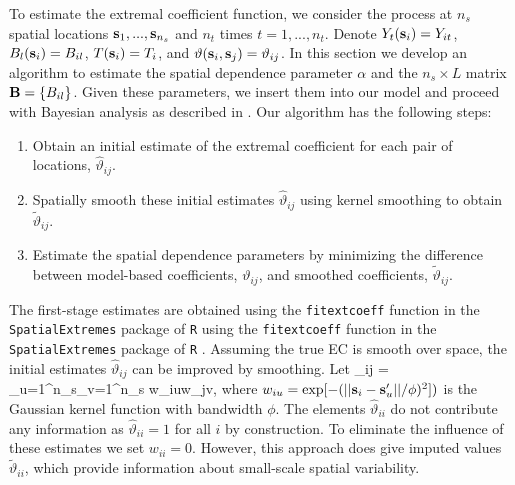 \documentclass[11pt]{article}
\begin{document}
To estimate the extremal coefficient function, we consider the process at $n_s$ spatial locations $\mbox{\bf s}_1,...,\mbox{\bf s}_{n_s}$ and $n_t$ times $t=1,...,n_t$.
Denote $Y_t(\mbox{\bf s}_i) = Y_{it}$, $B_l(\mbox{\bf s}_i) = B_{il}$, $T(\mbox{\bf s}_i)=T_i$, and $\vartheta(\mbox{\bf s}_i,\mbox{\bf s}_j) = \vartheta_{ij}$.
In this section we develop an algorithm to estimate the spatial dependence parameter $\alpha$ and the $n_s\times L$ matrix $\mbox{\bf B} = \{B_{il}\}$.
Given these parameters, we insert them into our model and proceed with Bayesian analysis as described in .
Our algorithm has the following steps:
\begin{enumerate}[(1)]
  \item Obtain an initial estimate of the extremal coefficient for each pair of locations, ${\hat \vartheta}_{ij}$.
  \item Spatially smooth these initial estimates ${\hat \vartheta}_{ij}$ using kernel smoothing to obtain ${\tilde \vartheta}_{ij}$.
  \item Estimate the spatial dependence parameters by minimizing the difference between model-based coefficients, $\vartheta_{ij}$, and smoothed coefficients, ${\tilde \vartheta}_{ij}$.
\end{enumerate}


The first-stage estimates are obtained using the \texttt{fitextcoeff} function in the \texttt{SpatialExtremes} package of \texttt{R}  using the \texttt{fitextcoeff} function in the \texttt{SpatialExtremes} \citep{Ribatet2015} package of \texttt{R} \citep{Rmanual}.
Assuming the true EC is smooth over space, the initial estimates ${\hat \vartheta}_{ij}$ can be improved by smoothing.
Let
\beq\label{ebeq:EChat2}
  {\tilde \vartheta}_{ij} = 
  {\sum_{u=1}^{n_s}\sum_{v=1}^{n_s} w_{iu}w_{jv}},
\eeq
where $w_{iu} = \exp[-(||\mbox{\bf s}_i-\mbox{\bf s}_u'||/\phi)^2])$ is the Gaussian kernel function with bandwidth $\phi$.
The elements ${\hat \vartheta}_{ii}$ do not contribute any information as ${\hat \vartheta}_{ii}=1$ for all $i$ by construction.
To eliminate the influence of these estimates we set $w_{ii}=0$.
However, this approach does give imputed values ${\tilde \vartheta}_{ii}$, which provide information about small-scale spatial variability.
\end{document}
